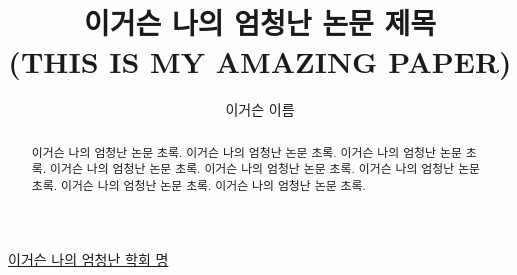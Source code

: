 
\title{\Huge \noindent \textbf{이거슨 나의 엄청난 논문 제목} \\ 
       \LARGE (THIS IS MY AMAZING PAPER)}
\author[1]{\vspace{2mm} 이거슨 이름}
\date{}
\renewcommand\bibname{}

\begin{center}
	\underline{이거슨 나의 엄청난 학회 명}
\end{center}
\vspace{\fill}
{\let\newpage\relax\maketitle}
\thispagestyle{empty}
\vspace{\fill}

\begin{abstract}
    이거슨 나의 엄청난 논문 초록. 이거슨 나의 엄청난 논문 초록. 이거슨 나의 엄청난 논문 초록. 이거슨 나의 엄청난 논문 초록. 이거슨 나의 엄청난 논문 초록. 이거슨 나의 엄청난 논문 초록. 이거슨 나의 엄청난 논문 초록. 이거슨 나의 엄청난 논문 초록. \\
    \hspace*{24pt}
\end{abstract}

\newpage
\thispagestyle{empty}
{\let\newpage\relax\tableofcontents}
\thispagestyle{fancy}
\pagestyle{fancy}
\fancyhf{}
\fancyfoot[R]{\thepage}
\vspace{3cm}